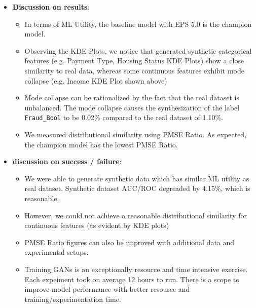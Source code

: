 \documentclass[10pt,twocolumn,letterpaper]{article}
\begin{document}
\begin{itemize}
    \item \textbf{Discussion on results}:
    \begin{itemize}
        \item In terms of ML Utility, the baseline model with EPS 5.0 is the champion model.
        \item Observing the KDE Plots, we notice that generated synthetic categorical features (e.g. Payment Type, Housing Status KDE Plots) show a close similarity to real data, whereas some continuous features exhibit mode collapse (e.g. Income KDE Plot shown above)
        \item Mode collapse can be rationalized by the fact that the real dataset is unbalanced. The mode collapse causes the synthesization of the label \verb'Fraud_Bool' to be 0.02\% compared to the real dataset of 1.10\%.
        \item We measured distributional similarity using PMSE Ratio. As expected, the champion model has the lowest PMSE Ratio.
    \end{itemize}


    \item \textbf{discussion on success / failure}:
    \begin{itemize}
        \item We were able to generate synthetic data which has similar ML utility as real dataset. Synthetic dataset AUC/ROC degreaded by 4.15\%, which is reasonable.
        \item However, we could not achieve a reasonable distributional similarity for continuous features (as evident by KDE plots)
        \item PMSE Ratio figures can also be improved with additional data and experimental setups.
        \item Training GANs is an exceptionally resource and time intensive exercise. Each expeiment took on average 12 hours to run. There is a scope to improve model performance with better resource and training/experimentation time.
    \end{itemize}

\end{itemize}
\end{document}
